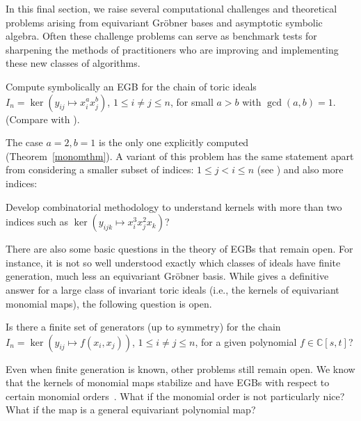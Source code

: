 
In this final section, we raise several computational challenges and theoretical problems arising from equivariant Gr\"obner bases and asymptotic symbolic algebra.  Often these challenge problems can serve as benchmark tests for sharpening the methods of practitioners who are improving and implementing these new classes of algorithms.

\begin{problem}
Compute symbolically an EGB for the chain of toric ideals $I_n = \ker(y_{ij} \mapsto x_i^a x_j^b)$, $1 \leq i \neq j \leq n$, for small $a>b$ with $\gcd(a,b)=1$. (Compare with \cite{Hillar13, hillar2016corrigendum, KKL:equivariant-markov, draisma2013noetherianity, Krone:egb-toric}).
\end{problem}

The case $a=2,b=1$ is the only one explicitly computed (Theorem~\ref{monomthm}). A variant of this problem has the same statement apart from considering a smaller subset of indices: $1 \leq j < i \leq n$ (see \cite[Remark 6.3]{draisma2013noetherianity}) and also more indices:

\begin{problem}
Develop combinatorial methodology to understand kernels with more than two indices such as $\ker(y_{ijk} \mapsto x_i^3 x_j^2 x_k)$?  
\end{problem}

There are also some basic questions in the theory of EGBs that remain open.  For instance, it is not so well understood exactly which classes of ideals have finite generation, much less an equivariant Gr\"obner basis. 
While \cite{draisma2013noetherianity} gives a definitive answer for a large class of invariant toric ideals (i.e., the kernels of equivariant monomial maps), the following question is open.
\begin{question}
Is there a finite set of generators (up to symmetry) for the chain $I_n = \ker(y_{ij} \mapsto f(x_i,x_j))$, $1 \leq i \neq j \leq n$, for a given polynomial $f \in \mathbb C[s,t]$?  
\end{question}

Even when finite generation is known, other problems still remain open.  
 We know that the kernels of monomial maps stabilize \cite{aschenbrenner2007finite, KKL:equivariant-markov, draisma2013noetherianity} and have EGBs with respect to certain monomial orders~\cite{Krone:egb-toric}. What if the monomial order is not particularly nice? What if the map is a general equivariant polynomial map?

